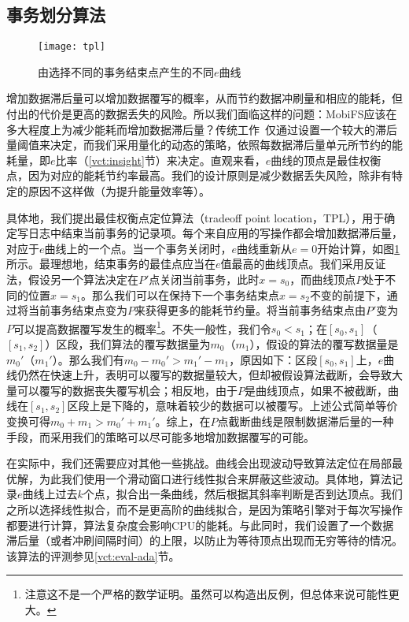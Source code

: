 \subsection{事务划分算法}
\label{vct:point}

\begin{figure}
\centering
\texttt{[image: tpl]}
\caption{由选择不同的事务结束点产生的不同$e$曲线}
\label{fig:tpl}
\end{figure}

增加数据滞后量可以增加数据覆写的概率，从而节约数据冲刷量和相应的能耗，但付出的代价是更高的数据丢失的风险。所以我们面临这样的问题：MobiFS应该在多大程度上为减少能耗而增加数据滞后量？传统工作~\cite{Ma:2011:LPF:1989323.1989325, Mickens:2014:BFC:2616448.2616473, Ports:2010:TCA:1924943.1924963}仅通过设置一个较大的滞后量阈值来决定，而我们采用量化的动态的策略，依照每数据滞后量单元所节约的能耗量，即$e$比率（\ref{vct:insight}节）来决定。直观来看，$e$曲线的顶点是最佳权衡点，因为对应的能耗节约率最高。我们的设计原则是减少数据丢失风险，除非有特定的原因不这样做（为提升能量效率等）。 

具体地，我们提出最佳权衡点定位算法（tradeoff point location，TPL），用于确定写日志中结束当前事务的记录项。每个来自应用的写操作都会增加数据滞后量，对应于$e$曲线上的一个点。当一个事务关闭时，$e$曲线重新从$e=0$开始计算，如图\ref{fig:tpl}所示。最理想地，结束事务的最佳点应当在$e$值最高的曲线顶点。我们采用反证法，假设另一个算法决定在$P'$点关闭当前事务，此时$x = s_0$，而曲线顶点$P$处于不同的位置$x = s_1$。那么我们可以在保持下一个事务结束点$x = s_2$不变的前提下，通过将当前事务结束点变为$P$来获得更多的能耗节约量。将当前事务结束点由$P'$变为$P$可以提高数据覆写发生的概率\footnote{注意这不是一个严格的数学证明。虽然可以构造出反例，但总体来说可能性更大。}。不失一般性，我们令$s_0 < s_1$；在$[s_0, s_1]$（$[s_1, s_2]$）区段，我们算法的覆写数据量为$m_0$（$m_1$），假设的算法的覆写数据量是$m_0'$（$m_1'$）。那么我们有$m_0 - m_0' > m_1' -
m_1$，原因如下：区段$[s_0, s_1]$上，$e$曲线仍然在快速上升，表明可以覆写的数据量较大，但却被假设算法截断，会导致大量可以覆写的数据丧失覆写机会；相反地，由于$P$是曲线顶点，如果不被截断，曲线在$[s_1, s_2]$区段上是下降的，意味着较少的数据可以被覆写。上述公式简单等价变换可得$m_0 + m_1 > m_0' + m_1'$。综上，在$P$点截断曲线是限制数据滞后量的一种手段，而采用我们的策略可以尽可能多地增加数据覆写的可能。
 
在实际中，我们还需要应对其他一些挑战。曲线会出现波动导致算法定位在局部最优解，为此我们使用一个滑动窗口进行线性拟合来屏蔽这些波动。具体地，算法记录$e$曲线上过去$k$个点，拟合出一条曲线，然后根据其斜率判断是否到达顶点。我们之所以选择线性拟合，而不是更高阶的曲线拟合，是因为策略引擎对于每次写操作都要进行计算，算法复杂度会影响CPU的能耗。与此同时，我们设置了一个数据滞后量（或者冲刷间隔时间）的上限，以防止为等待顶点出现而无穷等待的情况。该算法的评测参见\ref{vct:eval-ada}节。


